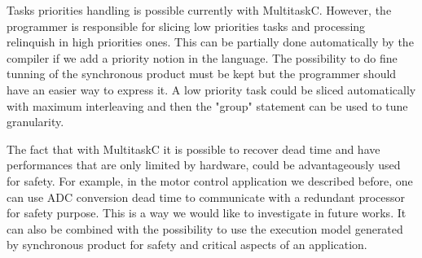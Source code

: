 \documentclass[10pt]{report}
\begin{document}
Tasks priorities handling is possible currently with MultitaskC. However, the programmer is responsible for slicing low
priorities tasks and processing relinquish in high priorities ones. This can be partially done automatically by the
compiler if we add a priority notion in the language. The possibility to do fine tunning of the synchronous product must
be kept but the programmer should have an easier way to express it. A low priority task could be sliced automatically with
maximum interleaving and then the "group" statement can be used to tune granularity.

The fact that with MultitaskC it is possible to recover dead time and have performances that are only limited by hardware,
could be advantageously used for safety. For example, in the motor control application we described before, one can use
ADC conversion dead time to communicate with a redundant processor for safety purpose. This is a way we would like to
investigate in future works. It can also be combined with the possibility to use the execution model generated
by synchronous product for safety and critical aspects of an application.


\scriptsize


\end{document}
